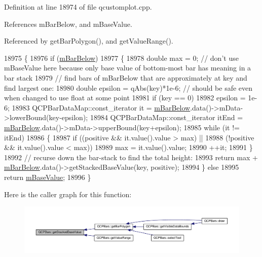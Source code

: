 Definition at line 18974 of file qcustomplot.\+cpp.



References m\+Bar\+Below, and m\+Base\+Value.



Referenced by get\+Bar\+Polygon(), and get\+Value\+Range().


\begin{DoxyCode}
18975 \{
18976   \textcolor{keywordflow}{if} (\hyperlink{class_q_c_p_bars_ad51db970eed7e286f2753b0216fc56de}{mBarBelow})
18977   \{
18978     \textcolor{keywordtype}{double} max = 0; \textcolor{comment}{// don't use mBaseValue here because only base value of bottom-most bar has meaning in
       a bar stack}
18979     \textcolor{comment}{// find bars of mBarBelow that are approximately at key and find largest one:}
18980     \textcolor{keywordtype}{double} epsilon = qAbs(key)*1e-6; \textcolor{comment}{// should be safe even when changed to use float at some point}
18981     \textcolor{keywordflow}{if} (key == 0)
18982       epsilon = 1e-6;
18983     QCPBarDataMap::const\_iterator it = \hyperlink{class_q_c_p_bars_ad51db970eed7e286f2753b0216fc56de}{mBarBelow}.data()->mData->lowerBound(key-epsilon);
18984     QCPBarDataMap::const\_iterator itEnd = \hyperlink{class_q_c_p_bars_ad51db970eed7e286f2753b0216fc56de}{mBarBelow}.data()->mData->upperBound(key+epsilon);
18985     \textcolor{keywordflow}{while} (it != itEnd)
18986     \{
18987       \textcolor{keywordflow}{if} ((positive && it.value().value > max) ||
18988           (!positive && it.value().value < max))
18989         max = it.value().value;
18990       ++it;
18991     \}
18992     \textcolor{comment}{// recurse down the bar-stack to find the total height:}
18993     \textcolor{keywordflow}{return} max + \hyperlink{class_q_c_p_bars_ad51db970eed7e286f2753b0216fc56de}{mBarBelow}.data()->getStackedBaseValue(key, positive);
18994   \} \textcolor{keywordflow}{else}
18995     \textcolor{keywordflow}{return} \hyperlink{class_q_c_p_bars_aa0515cf47fa6044cc28e59b1ae5ec759}{mBaseValue};
18996 \}
\end{DoxyCode}


Here is the caller graph for this function\+:\nopagebreak
\begin{figure}[H]
\begin{center}
\leavevmode
\includegraphics[width=350pt]{class_q_c_p_bars_ae9b0c2fad9f29030c84bb6e62a4b605f_icgraph}
\end{center}
\end{figure}


